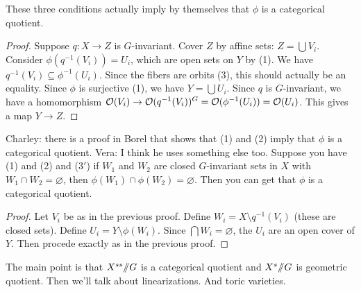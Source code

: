 These three conditions actually imply by themselves that $\phi$ is a categorical quotient.
\begin{proof}
 Suppose $q\colon X\to Z$ is $G$-invariant. Cover $Z$ by affine sets: $Z=\bigcup V_i$. Consider $\phi(q^{-1}(V_i))=U_i$, which are open sets on $Y$ by (1). We have $q^{-1}(V_i)\subseteq \phi^{-1}(U_i)$. Since the fibers are orbits (3), this should actually be an equality. Since $\phi$ is surjective (1), we have $Y=\bigcup U_i$. Since $q$ is $G$-invariant, we have a homomorphism $\mathcal{O}(V_i)\to \mathcal{O}(q^{-1}(V_i))^G=\mathcal{O}(\phi^{-1}(U_i))=\mathcal{O}(U_i)$. This gives a map $Y\to Z$.
\end{proof}
Charley: there is a proof in Borel that shows that (1) and (2) imply that $\phi$ is a categorical quotient. Vera: I think he uses something else too. Suppose you have (1) and (2) and (3$'$) if $W_1$ and $W_2$ are closed $G$-invariant sets in $X$ with $W_1\cap W_2=\varnothing$, then $\phi(W_1)\cap \phi(W_2)=\varnothing$. Then you can get that $\phi$ is a categorical quotient.
\begin{proof}
 Let $V_i$ be as in the previous proof. Define $W_i=X\setminus q^{-1}(V_i)$ (these are closed sets). Define $U_i=Y\setminus \phi(W_i)$. Since $\bigcap W_i=\varnothing$, the $U_i$ are an open cover of $Y$. Then procede exactly as in the previous proof.
\end{proof}
The main point is that $X^{ss}\mbox{\rm /\!\!/} G$ is a categorical quotient and $X^s\mbox{\rm /\!\!/} G$ is geometric quotient. Then we'll talk about linearizations. And toric varieties.